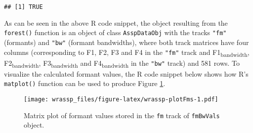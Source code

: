 \documentclass[
]{book}
\newenvironment{Shaded}{\begin{snugshade}}{\end{snugshade}}
\newcommand{\AttributeTok}[1]{\textcolor[rgb]{0.77,0.63,0.00}{#1}}
\newcommand{\CommentTok}[1]{\textcolor[rgb]{0.56,0.35,0.01}{\textit{#1}}}
\newcommand{\DecValTok}[1]{\textcolor[rgb]{0.00,0.00,0.81}{#1}}
\newcommand{\FunctionTok}[1]{\textcolor[rgb]{0.00,0.00,0.00}{#1}}
\newcommand{\NormalTok}[1]{#1}
\newcommand{\OtherTok}[1]{\textcolor[rgb]{0.56,0.35,0.01}{#1}}
\newcommand{\SpecialCharTok}[1]{\textcolor[rgb]{0.00,0.00,0.00}{#1}}
\newcommand{\StringTok}[1]{\textcolor[rgb]{0.31,0.60,0.02}{#1}}
\begin{document}
\begin{verbatim}
## [1] TRUE
\end{verbatim}

As can be seen in the above R code snippet, the object resulting from the \texttt{forest()} function is an object of class \texttt{AsspDataObj} with the tracks \texttt{"fm"} (formants) and \texttt{"bw"} (formant bandwidths), where both track matrices have four columns (corresponding to F1, F2, F3 and F4 in the \texttt{"fm"} track and F1\textsubscript{bandwidth}, F2\textsubscript{bandwidth}, F3\textsubscript{bandwidth} and F4\textsubscript{bandwidth} in the \texttt{"bw"} track) and 581 rows. To visualize the calculated formant values, the R code snippet below shows how R's \texttt{matplot()} function can be used to produce Figure \ref{fig:wrassp-plotFms}.

\begin{Shaded}
\end{Shaded}

\begin{figure}
\centering
\texttt{[image: wrassp\_files/figure-latex/wrassp-plotFms-1.pdf]}
\caption{\label{fig:wrassp-plotFms}Matrix plot of formant values stored in the \texttt{fm} track of \texttt{fmBwVals} object.}
\end{figure}
\end{document}
